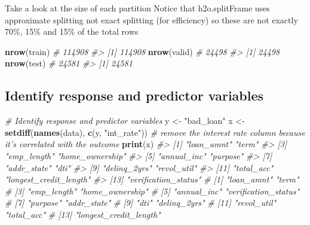 \documentclass[]{book}
\newenvironment{Shaded}{\begin{snugshade}}{\end{snugshade}}
\newcommand{\CommentTok}[1]{\textcolor[rgb]{0.56,0.35,0.01}{\textit{#1}}}
\newcommand{\KeywordTok}[1]{\textcolor[rgb]{0.13,0.29,0.53}{\textbf{#1}}}
\newcommand{\NormalTok}[1]{#1}
\newcommand{\StringTok}[1]{\textcolor[rgb]{0.31,0.60,0.02}{#1}}
\begin{document}
Take a look at the size of each partition
Notice that h2o.splitFrame uses approximate splitting not exact splitting (for efficiency) so these are not exactly 70\%, 15\% and 15\% of the total rows

\begin{Shaded}
\begin{Highlighting}[]
\KeywordTok{nrow}\NormalTok{(train)  }\CommentTok{# 114908}
\CommentTok{#> [1] 114908}
\KeywordTok{nrow}\NormalTok{(valid) }\CommentTok{# 24498}
\CommentTok{#> [1] 24498}
\KeywordTok{nrow}\NormalTok{(test)  }\CommentTok{# 24581}
\CommentTok{#> [1] 24581}
\end{Highlighting}
\end{Shaded}

\hypertarget{identify-response-and-predictor-variables}{%
\subsection{Identify response and predictor variables}\label{identify-response-and-predictor-variables}}

\begin{Shaded}
\begin{Highlighting}[]
\CommentTok{# Identify response and predictor variables}
\NormalTok{y <-}\StringTok{ "bad_loan"}
\NormalTok{x <-}\StringTok{ }\KeywordTok{setdiff}\NormalTok{(}\KeywordTok{names}\NormalTok{(data), }\KeywordTok{c}\NormalTok{(y, }\StringTok{"int_rate"}\NormalTok{))  }\CommentTok{# remove the interest rate column because it's correlated with the outcome}
\KeywordTok{print}\NormalTok{(x)}
\CommentTok{#>  [1] "loan_amnt"             "term"                 }
\CommentTok{#>  [3] "emp_length"            "home_ownership"       }
\CommentTok{#>  [5] "annual_inc"            "purpose"              }
\CommentTok{#>  [7] "addr_state"            "dti"                  }
\CommentTok{#>  [9] "delinq_2yrs"           "revol_util"           }
\CommentTok{#> [11] "total_acc"             "longest_credit_length"}
\CommentTok{#> [13] "verification_status"}
\CommentTok{# [1] "loan_amnt"             "term"                 }
\CommentTok{# [3] "emp_length"            "home_ownership"       }
\CommentTok{# [5] "annual_inc"            "verification_status"  }
\CommentTok{# [7] "purpose"               "addr_state"           }
\CommentTok{# [9] "dti"                   "delinq_2yrs"          }
\CommentTok{# [11] "revol_util"            "total_acc"            }
\CommentTok{# [13] "longest_credit_length"}
\end{Highlighting}
\end{Shaded}
\end{document}
